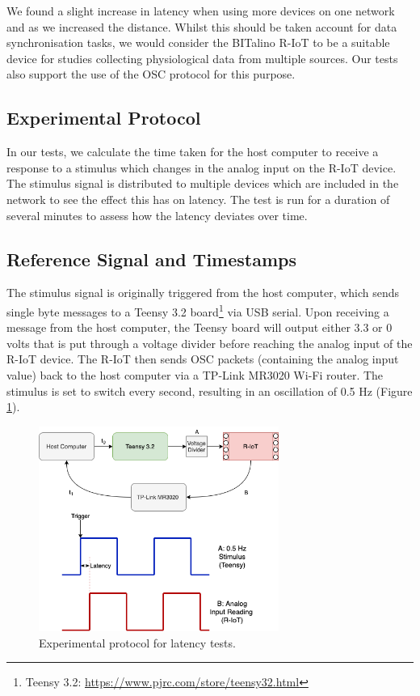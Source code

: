 We found a slight increase in latency when using more devices on one network and as we increased the distance. Whilst this should be taken account for data synchronisation tasks, we would consider the BITalino R-IoT to be a suitable device for studies collecting physiological data from multiple sources. Our tests also support the use of the OSC protocol for this purpose.

\subsection{Experimental Protocol}

In our tests, we calculate the time taken for the host computer to receive a response to a stimulus which changes in the analog input on the R-IoT device. The stimulus signal is distributed to multiple devices which are included in the network to see the effect this has on latency. The test is run for a duration of several minutes to assess how the latency deviates over time.

\subsection*{Reference Signal and Timestamps}
The stimulus signal is originally triggered from the host computer, which sends single byte messages to a Teensy 3.2 board\footnote{Teensy 3.2: \url{https://www.pjrc.com/store/teensy32.html}} via USB serial. Upon receiving a message from the host computer, the Teensy board will output either 3.3 or 0 volts that is put through a voltage divider before reaching the analog input of the R-IoT device. The R-IoT then sends OSC packets (containing the analog input value) back to the host computer via a TP-Link MR3020 Wi-Fi router. The stimulus is set to switch every second, resulting in an oscillation of 0.5 Hz (Figure \ref{fig:latency_fig1}).

\begin{figure}[htbp]
  \centering
    \includegraphics[width=0.7\textwidth]{Chapters/Figures/technical/Latency/figure1.png}
    \caption{Experimental protocol for latency tests.}
    \label{fig:latency_fig1}
\end{figure}


